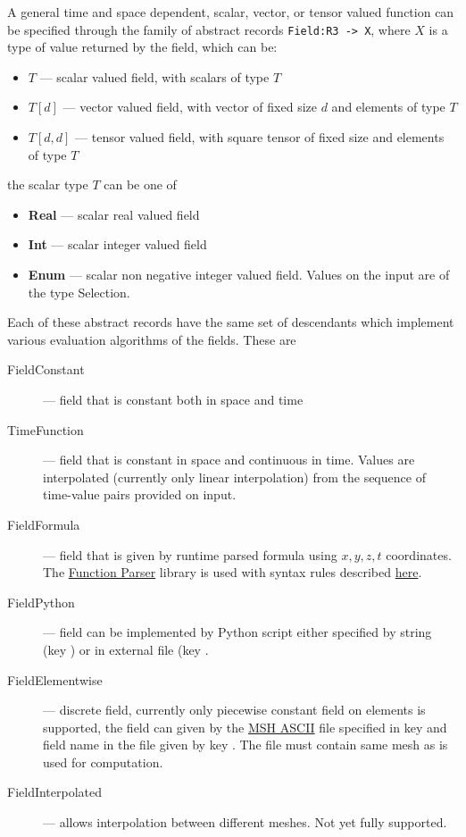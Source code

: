 A general time and space dependent, scalar, vector, or  tensor valued function can be specified through the family of abstract records 
\verb'Field:R3 -> X', where $X$ is a type of value returned by the field, which can be:
\begin{itemize}
 \item $T$ --- scalar valued field, with scalars of type $T$
 \item $T[d]$ --- vector valued field, with vector of fixed size $d$ and elements of type $T$
 \item $T[d, d]$ --- tensor valued field, with square tensor of fixed size and elements of type $T$
\end{itemize}
the scalar type $T$ can be one of
\begin{itemize}
 \item {\bf Real} --- scalar real valued field
 \item {\bf Int}  --- scalar integer valued field
 \item {\bf Enum} --- scalar non negative integer valued field. Values on the input are of the type Selection.
\end{itemize}

Each of these abstract records have the same set of descendants which implement various evaluation algorithms of the fields. These are
\begin{description}
 \item[FieldConstant] --- field that is constant both in space and time
 \item[TimeFunction] --- field that is constant in space and continuous in time. Values are interpolated (currently only linear interpolation) from 
 the sequence of time-value pairs provided on input.
 \item[FieldFormula] --- field that is given by runtime parsed formula using $x,y,z,t$ coordinates. The \href{http://warp.povusers.org/FunctionParser/}{Function Parser} library is used
 with syntax rules described \href{http://warp.povusers.org/FunctionParser/fparser.html#literals}{here}.
 \item[FieldPython] --- field can be implemented by Python script either specified by string (key ) 
 or in external file (key . 
 \item[FieldElementwise] --- discrete field, currently only piecewise constant field on elements is supported, the field can given by 
 the \href{http://geuz.org/gmsh/doc/texinfo/gmsh.html#MSH-ASCII-file-format}{MSH ASCII} file specified in key  and field name in the file given 
 by key . The file must contain same mesh as is used for computation.
 \item[FieldInterpolated] --- allows interpolation between different meshes. Not yet fully supported.
\end{description}

